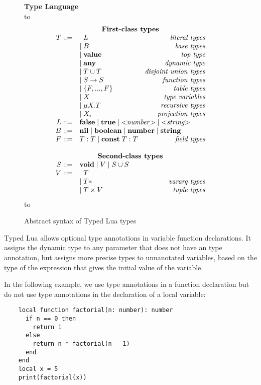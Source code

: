 \documentclass[preprint]{sig-alternate}
\newcommand{\Any}{\mathbf{any}}
\newcommand{\Top}{\mathbf{value}}
\newcommand{\Nil}{\mathbf{nil}}
\newcommand{\False}{\mathbf{false}}
\newcommand{\True}{\mathbf{true}}
\newcommand{\Boolean}{\mathbf{boolean}}
\newcommand{\Number}{\mathbf{number}}
\newcommand{\String}{\mathbf{string}}
\newcommand{\Void}{\mathbf{void}}
\newcommand{\Const}{\mathbf{const}}
\def\dstart{\hbox to \hsize{\vrule depth 4pt\hrulefill\vrule depth 4pt}}
\def\dend{\hbox to \hsize{\vrule height 4pt\hrulefill\vrule height 4pt}}
\begin{document}
\begin{figure}[!ht]
\textbf{Type Language}\\
\dstart
$$
\begin{array}{rlr}
\multicolumn{3}{c}{\textbf{First-class types}} \\
T ::= & \;\; L & \textit{literal types}\\
& | \; B & \textit{base types}\\
& | \; \Top & \textit{top type}\\
& | \; \Any & \textit{dynamic type}\\
& | \; T \cup T & \textit{disjoint union types}\\
& | \; S \rightarrow S & \textit{function types}\\
& | \; \{F, ..., F\} & \textit{table types}\\
& | \; X & \textit{type variables}\\
& | \; \mu X.T & \textit{recursive types}\\
& | \; X_i & \textit{projection types}\\
L ::= & \multicolumn{2}{l}{\False \; | \; \True \; | \; {<}{\it number}{>} \; | \; {<}{\it string}{>} } \\
B ::= & \multicolumn{2}{l}{\Nil \; | \; \Boolean \; | \; \Number \; | \; \String} \\
F ::= & T:T \; | \; \Const \; T:T & \textit{field types} \\
\multicolumn{3}{c}{} \\
\multicolumn{3}{c}{\textbf{Second-class types}} \\
S ::= &  \multicolumn{2}{l}{\Void \; |\; V \; | \; S \cup S} \\
V ::= & \;\; T & \\
& | \; T* & \textit{vararg types}\\
& | \; T \times V & \textit{tuple types}
\end{array}
$$
\dend
\caption{Abstract syntax of Typed Lua types}
\label{fig:typelang}
\end{figure}

Typed Lua allows optional type annotations in variable function
declarations. It assigns the dynamic type to any parameter that
does not have an type annotation, but assigns more precise
types to unnanotated variables, based on the type of the
expression that gives the initial value of the variable.

In the following example, we use type annotations in a function
declaration but do not use type annotations in the declaration of a
local variable:
\begin{verbatim}
    local function factorial(n: number): number
      if n == 0 then
        return 1
      else
        return n * factorial(n - 1)
      end
    end
    local x = 5
    print(factorial(x))
\end{verbatim}
\end{document}
